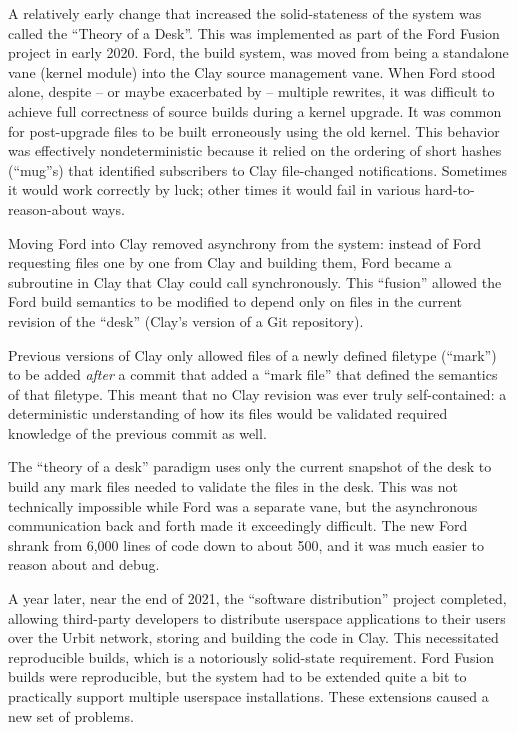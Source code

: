\documentclass[twoside]{article}
\begin{document}
A relatively early change that increased the solid-stateness of the system was called the ``Theory of a Desk''.  This was implemented as part of the Ford Fusion project in early 2020.  Ford, the build system, was moved from being a standalone vane (kernel module) into the Clay source management vane.  When Ford stood alone, despite – or maybe exacerbated by – multiple rewrites, it was difficult to achieve full correctness of source builds during a kernel upgrade.  It was common for post-upgrade files to be built erroneously using the old kernel.  This behavior was effectively nondeterministic because it relied on the ordering of short hashes (``mug''s) that identified subscribers to Clay file-changed notifications.  Sometimes it would work correctly by luck; other times it would fail in various hard-to-reason-about ways.

Moving Ford into Clay removed asynchrony from the system:  instead of Ford requesting files one by one from Clay and building them, Ford became a subroutine in Clay that Clay could call synchronously.  This ``fusion'' allowed the Ford build semantics to be modified to depend only on files in the current revision of the ``desk'' (Clay's version of a Git repository).

Previous versions of Clay only allowed files of a newly defined filetype (``mark'') to be added \emph{after} a commit that added a ``mark file'' that defined the semantics of that filetype.  This meant that no Clay revision was ever truly self-contained: a deterministic understanding of how its files would be validated required knowledge of the previous commit as well.

The ``theory of a desk'' paradigm uses only the current snapshot of the desk to build any mark files needed to validate the files in the desk.  This was not technically impossible while Ford was a separate vane, but the asynchronous communication back and forth made it exceedingly difficult.  The new Ford shrank from 6,000 lines of code down to about 500, and it was much easier to reason about and debug.

A year later, near the end of 2021, the ``software distribution'' project completed, allowing third-party developers to distribute userspace applications to their users over the Urbit network, storing and building the code in Clay.  This necessitated reproducible builds, which is a notoriously solid-state requirement.  Ford Fusion builds were reproducible, but the system had to be extended quite a bit to practically support multiple userspace installations.  These extensions caused a new set of problems.
\end{document}
